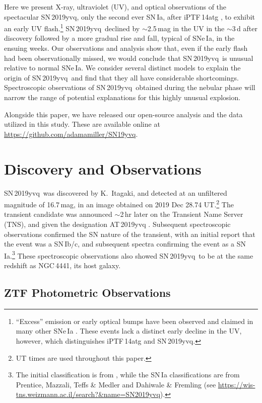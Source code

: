 \documentclass[twocolumn]{aastex63}
\newcommand{\sn}{SN\,2019yvq}
\begin{document}
Here we present X-ray, ultraviolet (UV), and optical observations of the
spectacular \sn, only the second ever SN\,Ia, after iPTF\,14atg \citep{Cao15},
to exhibit an early UV flash.\footnote{``Excess'' emission or early optical
bumps have been observed and claimed in many other SNe\,Ia
\citep[e.g.,][]{Goobar15,Marion16,Hosseinzadeh17,Jiang17,Shappee19,
Dimitriadis19}. These events lack a distinct early decline in the UV, however,
which distinguishes iPTF\,14atg and \sn.} \sn\ declined by $\sim$2.5\,mag in
the UV in the $\sim$3\,d after discovery followed by a more gradual rise and
fall, typical of SNe\,Ia, in the ensuing weeks. Our observations and analysis
show that, even if the early flash had been observationally missed, we would
conclude that \sn\ is unusual relative to normal SNe\,Ia. We consider several
distinct models to explain the origin of \sn\ and find that they all have
considerable shortcomings. Spectroscopic observations of \sn\ obtained during
the nebular phase will narrow the range of potential explanations for this
highly unusual explosion.

Alongside this paper, we have released our open-source analysis and the data
utilized in this study. These are available online at
\href{https://github.com/adamamiller/SN19yvq}{\url{https://github.com/adamamiller/SN19yvq}}.

\section{Discovery and Observations}\label{sec:obs}

\sn\ was discovered by K.~Itagaki, and detected at an unfiltered magnitude
of 16.7\,mag, in an image obtained on 2019 Dec 28.74 UT.\footnote{UT times
are used throughout this paper.} The transient candidate was announced
$\sim$2\,hr later on the Transient Name Server (TNS), and given the
designation AT\,2019yvq \citep{Itagaki19}. Subsequent spectroscopic
observations confirmed the SN nature of the transient, with an initial
report that the event was a SN\,Ib/c, and subsequent spectra confirming the
event as a SN\,Ia.\footnote{The initial classification is from
\citet{Kawabata20}, while the SN\,Ia classifications are from Prentice,
Mazzali, Teffs \& Medler and Dahiwale \& Fremling (see
\url{https://wis-tns.weizmann.ac.il/search?&name=SN2019yvq}).} These
spectroscopic observations also showed \sn\ to be at the same redshift as
NGC\,4441, its host galaxy.

\subsection{ZTF Photometric Observations}
\end{document}

